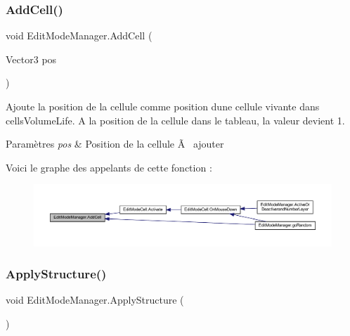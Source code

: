 \subsubsection{\texorpdfstring{Add\+Cell()}{AddCell()}}
{\footnotesize\ttfamily void Edit\+Mode\+Manager.\+Add\+Cell (\begin{DoxyParamCaption}\item[{Vector3}]{pos }\end{DoxyParamCaption})\hspace{0.3cm}{\ttfamily [inline]}}



Ajoute la position de la cellule comme position d\textquotesingle{}une cellule vivante dans cells\+Volume\+Life. A la position de la cellule dans le tableau, la valeur devient 1. 


\begin{DoxyParams}{Paramètres}
{\em pos} & Position de la cellule Ã  ajouter\\
\hline
\end{DoxyParams}
Voici le graphe des appelants de cette fonction \+:\nopagebreak
\begin{figure}[H]
\begin{center}
\leavevmode
\includegraphics[width=350pt]{class_edit_mode_manager_a9f9fbe57f5bbb6b90dc1dc321d411c54_icgraph}
\end{center}
\end{figure}
\mbox{\label{class_edit_mode_manager_ac1d4e4f292d17b4364054f05ddc13bee}} 
\subsubsection{\texorpdfstring{Apply\+Structure()}{ApplyStructure()}}
{\footnotesize\ttfamily void Edit\+Mode\+Manager.\+Apply\+Structure (\begin{DoxyParamCaption}{ }\end{DoxyParamCaption})\hspace{0.3cm}{\ttfamily [inline]}}



